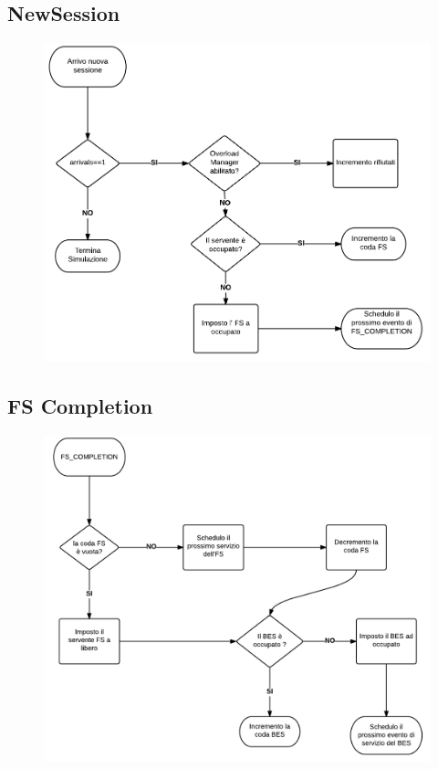 \subsection{NewSession}
\begin{figure}[H]
  \centering
  \includegraphics[scale=0.35]{img/NewSession.png}
  \label{fig:NewSession}
\end{figure}
\subsection{FS Completion}
\begin{figure}[H]
  \centering
  \includegraphics[scale=0.35]{img/FS_Completion.png}
  \label{fig:FS_Completion}
\end{figure}

